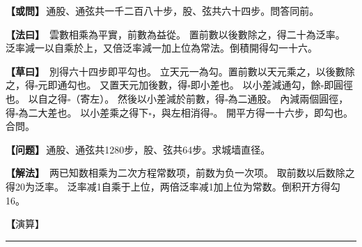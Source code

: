 \documentclass[11pt,a4paper]{article}
\let\origsquare\square
\renewcommand{\square}{\ensuremath{\origsquare}}%
\newcommand{\longline}{\noindent\rule{\textwidth}{0.4pt}}
\newcommand{\clOWEN}[1]{%
  \par\vspace{0.3em}%
  \noindent\textcolor{problemcolor}{\textbf{【或問】}}\,{\tradfont #1}\par\nopagebreak%
}
\newcommand{\mdOWEN}[1]{%
  \par\vspace{0.3em}%
  \noindent\textcolor{problemcolor}{\textbf{【问题】}}\,{\modfont #1}\par\nopagebreak%
}
\newcommand{\clFAYUE}[1]{%
  \par\noindent\textcolor{methodcolor}{\textbf{【法曰】}}\,{\tradfont #1}\par\nopagebreak%
}
\newcommand{\mdFAYUE}[1]{%
  \par\noindent\textcolor{methodcolor}{\textbf{【解法】}}\,{\modfont #1}\par\nopagebreak%
}
\newcommand{\clTSAOYUE}[1]{%
  \par\noindent\textcolor{workcolor}{\textbf{【草曰】}}\,{\tradfont #1}\par%
}
\newcommand{\mdTSAOYUE}[1]{%
  \par\noindent\textcolor{workcolor}{\textbf【演算】}}\,{\modfont #1}\par%
\begin{document}
\begin{paracol}{2}

\begin{leftcolumn}
\clOWEN{通股、通弦共一千二百八十步，股、弦共六十四步。問答同前。}

\clFAYUE{%
雲數相乘為平實，前數為益從。
置前數以後數除之，得二十為泛率。
泛率減一以自乘於上，又倍泛率減一加上位為常法。倒積開得勾一十六。}

\clTSAOYUE{%
別得六十四步即平勾也。
立天元一為勾。置前數以天元乘之，以後數除之，得$\square$元即通勾也。
又置天元加後數，得$\square$即小差也。
以小差減通勾，餘$\square$即圓徑也。
以自之得$\square$（寄左）。
然後以小差減於前數，得$\square$為二通股。
內減兩個圓徑，得$\square$為二大差也。
以小差乘之得下$\square$，與左相消得$\square$。
開平方得一十六步，即勾也。合問。}
\end{leftcolumn}

\switchcolumn

\begin{rightcolumn}
\mdOWEN{通股、通弦共1280步，股、弦共64步。求城墙直径。}

\mdFAYUE{%
两已知数相乘为二次方程常数项，前数为负一次项。
取前数以后数除之得20为泛率。
泛率减1自乘于上位，两倍泛率减1加上位为常数。倒积开方得勾16。}

\mdTSAOYUE{%
辨识得：64步即平勾。
设天元一为勾。取前数以天元乘之，以后数除之，得$\square$元即通勾。
又取天元加后数得$\square$即小差。
以小差减通勾，余$\square$即圆径。
自乘得$\square$（寄左）。
然后以小差减于前数得$\square$为二通股。
内减两个圆径得$\square$为二大差。
以小差乘之得下式$\square$，与左式相消得$\square$。
开平方得16步，即勾。符合所问。}
\end{rightcolumn}

\end{paracol}

\vspace{0.3cm}
\begin{center}\longline\end{center}
\end{document}
